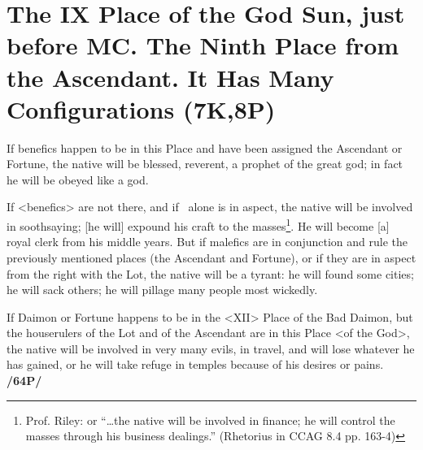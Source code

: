 \section*{The IX Place of the God Sun, just before MC. The Ninth 
Place from the Ascendant. It Has Many Configurations (7K,8P)}
If benefics happen to be in this Place and have been assigned the Ascendant or Fortune, the native will be blessed, reverent, a prophet of the great god; in fact he will be obeyed like a god.

If <benefics> are not there, and if \Mercury\, alone is in aspect, the native will be involved in soothsaying; [he will] expound his craft to the masses\footnote{Prof. Riley: or “…the native will be involved in finance; he will control the masses through his business dealings.” (Rhetorius in CCAG 8.4 pp. 163-4)}. He will become [a] royal clerk from his middle years. But if malefics are in conjunction and rule the previously mentioned places (the Ascendant and Fortune), or if they are in aspect from the right with the Lot, the native will be a tyrant: he will found some cities; he will sack others; he will pillage many people most wickedly. 

 
If Daimon or Fortune happens to be in the <XII> Place of the Bad Daimon, but the houserulers of the Lot and of the Ascendant are in this Place <of the God>, the native will be involved in very many evils, in travel, and will lose whatever he has gained, or he will take refuge in temples because of his desires or pains. \textbf{/64P/}

\newpage